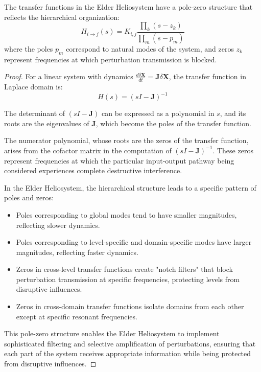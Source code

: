 \begin{theorem}
The transfer functions in the Elder Heliosystem have a pole-zero structure that reflects the hierarchical organization:
\begin{equation}
H_{i \to j}(s) = K_{i,j} \frac{\prod_k (s - z_k)}{\prod_m (s - p_m)}
\end{equation}
where the poles $p_m$ correspond to natural modes of the system, and zeros $z_k$ represent frequencies at which perturbation transmission is blocked.
\end{theorem}

\begin{proof}
For a linear system with dynamics $\frac{d\delta\mathbf{X}}{dt} = \mathbf{J} \delta\mathbf{X}$, the transfer function in Laplace domain is:
\begin{equation}
H(s) = (sI - \mathbf{J})^{-1}
\end{equation}

The determinant of $(sI - \mathbf{J})$ can be expressed as a polynomial in $s$, and its roots are the eigenvalues of $\mathbf{J}$, which become the poles of the transfer function.

The numerator polynomial, whose roots are the zeros of the transfer function, arises from the cofactor matrix in the computation of $(sI - \mathbf{J})^{-1}$. These zeros represent frequencies at which the particular input-output pathway being considered experiences complete destructive interference.

In the Elder Heliosystem, the hierarchical structure leads to a specific pattern of poles and zeros:
\begin{itemize}
    \item Poles corresponding to global modes tend to have smaller magnitudes, reflecting slower dynamics.
    \item Poles corresponding to level-specific and domain-specific modes have larger magnitudes, reflecting faster dynamics.
    \item Zeros in cross-level transfer functions create "notch filters" that block perturbation transmission at specific frequencies, protecting levels from disruptive influences.
    \item Zeros in cross-domain transfer functions isolate domains from each other except at specific resonant frequencies.
\end{itemize}

This pole-zero structure enables the Elder Heliosystem to implement sophisticated filtering and selective amplification of perturbations, ensuring that each part of the system receives appropriate information while being protected from disruptive influences.
\end{proof}

